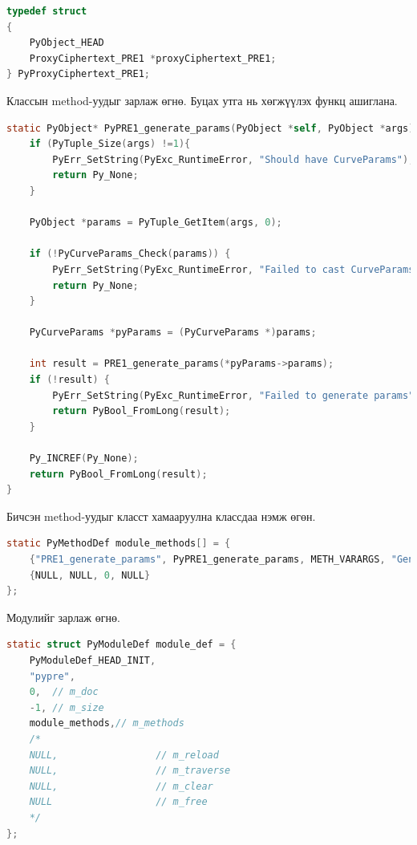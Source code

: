 \begin{lstlisting}[language=C, caption={pypre.cpp},captionpos=b]
typedef struct
{
    PyObject_HEAD
    ProxyCiphertext_PRE1 *proxyCiphertext_PRE1;
} PyProxyCiphertext_PRE1;
\end{lstlisting}

\noindent Классын method-уудыг зарлаж өгнө. Буцах утга нь хөгжүүлэх функц ашиглана.

\begin{lstlisting}[language=C, caption={generate\_params method}, captionpos=b]
static PyObject* PyPRE1_generate_params(PyObject *self, PyObject *args) {
    if (PyTuple_Size(args) !=1){
        PyErr_SetString(PyExc_RuntimeError, "Should have CurveParams");
        return Py_None;
    }

    PyObject *params = PyTuple_GetItem(args, 0);

    if (!PyCurveParams_Check(params)) {
        PyErr_SetString(PyExc_RuntimeError, "Failed to cast CurveParams");
        return Py_None;
    }

    PyCurveParams *pyParams = (PyCurveParams *)params;

    int result = PRE1_generate_params(*pyParams->params);
    if (!result) {
        PyErr_SetString(PyExc_RuntimeError, "Failed to generate params");
        return PyBool_FromLong(result);
    }

    Py_INCREF(Py_None);
    return PyBool_FromLong(result);
}
\end{lstlisting}

\noindent Бичсэн method-уудыг класст хамааруулна классдаа нэмж өгөн.

\begin{lstlisting}[language=C, caption={generate_params method-г класст хамааруулна.}, captionpos=b]
static PyMethodDef module_methods[] = {
    {"PRE1_generate_params", PyPRE1_generate_params, METH_VARARGS, "Generate curve parameters for the PRE1 scheme."},
    {NULL, NULL, 0, NULL}
};
\end{lstlisting}
\noindent Модулийг зарлаж өгнө. 
\begin{lstlisting}[language=C, caption={Модуль зарлалт}, captionpos=b]
static struct PyModuleDef module_def = {
    PyModuleDef_HEAD_INIT,
    "pypre",
    0,  // m_doc
    -1, // m_size
    module_methods,// m_methods
    /*
    NULL,                 // m_reload
    NULL,                 // m_traverse
    NULL,                 // m_clear
    NULL                  // m_free
    */
};

\end{lstlisting}

